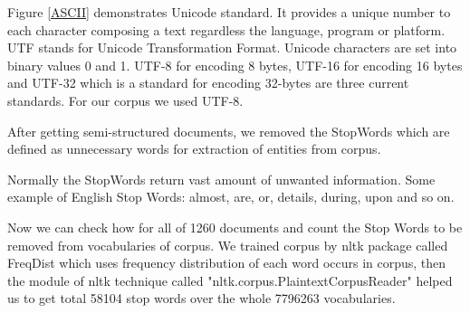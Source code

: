 Figure \ref{ASCII} demonstrates Unicode  standard. It provides  a unique number to each character composing a text regardless the language, program  or platform.
UTF stands for Unicode Transformation Format. Unicode characters are set into binary values 0 and 1. UTF-8 for encoding  8 bytes, UTF-16 for encoding 16 bytes and UTF-32 which is a standard for encoding 32-bytes are three current standards.
For our corpus we used UTF-8.

After getting semi-structured documents, we removed the StopWords which are defined as unnecessary words for extraction of entities from corpus.

Normally the StopWords return vast amount of unwanted information. Some example of English Stop Words: almost, are, or,  details, during, upon and so on.

Now we can check how for all of 1260 documents and count the Stop Words to be removed from vocabularies of corpus. We trained corpus by nltk package called FreqDist which uses  frequency distribution of each word occurs in corpus, then the module of nltk technique called "nltk.corpus.PlaintextCorpusReader" helped us to get total 58104 stop words over the whole  7796263  vocabularies.

